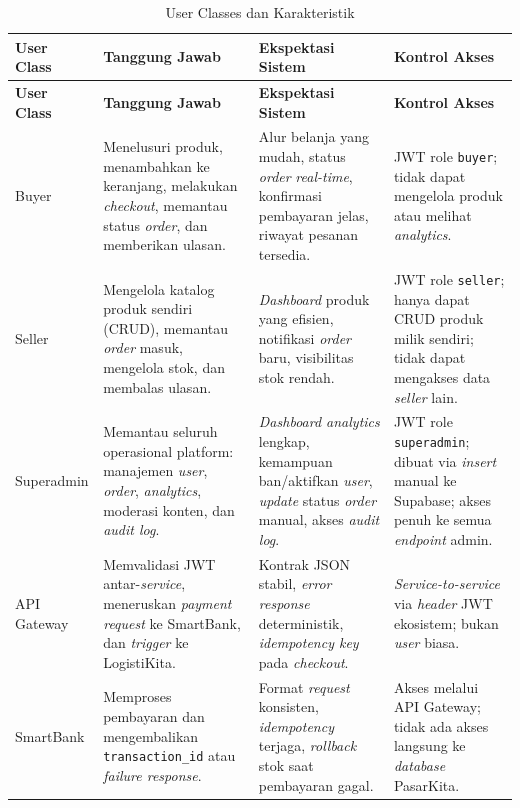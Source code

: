 \begin{longtable}{|L{2.2cm}|L{3.8cm}|L{4.5cm}|L{4cm}|}
    \caption{User Classes dan Karakteristik}
    \label{tab:user-classes} \\
    \hline
    \textbf{User Class} & \textbf{Tanggung Jawab} & \textbf{Ekspektasi Sistem}
        & \textbf{Kontrol Akses} \\
    \hline
    \endfirsthead
    \hline
    \textbf{User Class} & \textbf{Tanggung Jawab} & \textbf{Ekspektasi Sistem}
        & \textbf{Kontrol Akses} \\
    \hline
    \endhead
    \hline
    \endfoot
    Buyer
        & Menelusuri produk, menambahkan ke keranjang, melakukan \textit{checkout},
          memantau status \textit{order}, dan memberikan ulasan.
        & Alur belanja yang mudah, status \textit{order} \textit{real-time},
          konfirmasi pembayaran jelas, riwayat pesanan tersedia.
        & JWT role \texttt{buyer}; tidak dapat mengelola produk atau melihat \textit{analytics}. \\
    \hline
    Seller
        & Mengelola katalog produk sendiri (CRUD), memantau \textit{order} masuk,
          mengelola stok, dan membalas ulasan.
        & \textit{Dashboard} produk yang efisien, notifikasi \textit{order} baru,
          visibilitas stok rendah.
        & JWT role \texttt{seller}; hanya dapat CRUD produk milik sendiri; tidak
          dapat mengakses data \textit{seller} lain. \\
    \hline
    Superadmin
        & Memantau seluruh operasional platform: manajemen \textit{user},
          \textit{order}, \textit{analytics}, moderasi konten, dan \textit{audit log}.
        & \textit{Dashboard analytics} lengkap, kemampuan ban/aktifkan \textit{user},
          \textit{update} status \textit{order} manual, akses \textit{audit log}.
        & JWT role \texttt{superadmin}; dibuat via \textit{insert} manual ke
          Supabase; akses penuh ke semua \textit{endpoint} admin. \\
    \hline
    API Gateway
        & Memvalidasi JWT antar-\textit{service}, meneruskan \textit{payment request}
          ke SmartBank, dan \textit{trigger} ke LogistiKita.
        & Kontrak JSON stabil, \textit{error response} deterministik,
          \textit{idempotency key} pada \textit{checkout}.
        & \textit{Service-to-service} via \textit{header} JWT ekosistem; bukan
          \textit{user} biasa. \\
    \hline
    SmartBank
        & Memproses pembayaran dan mengembalikan \texttt{transaction\_id} atau
          \textit{failure response}.
        & Format \textit{request} konsisten, \textit{idempotency} terjaga,
          \textit{rollback} stok saat pembayaran gagal.
        & Akses melalui API Gateway; tidak ada akses langsung ke \textit{database}
          PasarKita. \\
    \hline
\end{longtable}

